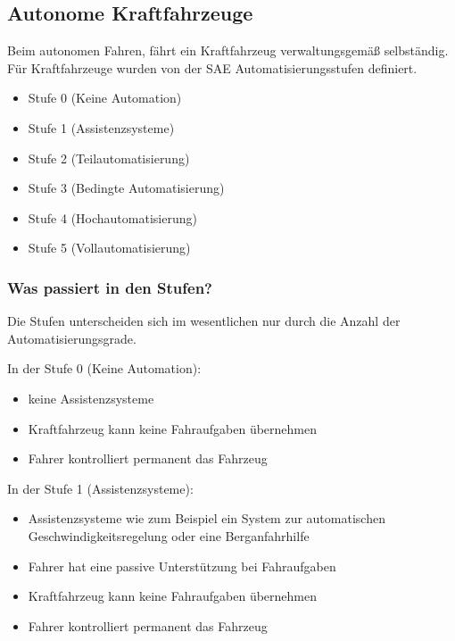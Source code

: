 \subsection{Autonome Kraftfahrzeuge}
Beim autonomen Fahren, fährt ein Kraftfahrzeug verwaltungsgemäß selbständig.
Für Kraftfahrzeuge wurden von der \ac{SAE} Automatisierungsstufen definiert\cite{PRACTICE}.
\begin{itemize}
	\item Stufe 0 (Keine Automation)
	\item Stufe 1 (Assistenzsysteme)
	\item Stufe 2 (Teilautomatisierung)
	\item Stufe 3 (Bedingte Automatisierung)
	\item Stufe 4 (Hochautomatisierung)
	\item Stufe 5 (Vollautomatisierung)
\end{itemize}
\subsubsection{Was passiert in den Stufen?}
Die Stufen unterscheiden sich im wesentlichen nur durch die Anzahl der Automatisierungsgrade.

\vspace{0.5cm}

In der Stufe 0 (Keine Automation):
\begin{itemize}
	\item keine Assistenzsysteme
	\item Kraftfahrzeug kann keine Fahraufgaben übernehmen
	\item Fahrer kontrolliert permanent das Fahrzeug
\end{itemize}

\vspace{0.5cm}

In der Stufe 1 (Assistenzsysteme):
\begin{itemize}
	\item Assistenzsysteme wie zum Beispiel ein System zur automatischen Geschwindigkeitsregelung oder eine Berganfahrhilfe
	\item Fahrer hat eine passive Unterstützung bei Fahraufgaben
	\item Kraftfahrzeug kann keine Fahraufgaben übernehmen
	\item Fahrer kontrolliert permanent das Fahrzeug
\end{itemize}

\vspace{0.5cm}

